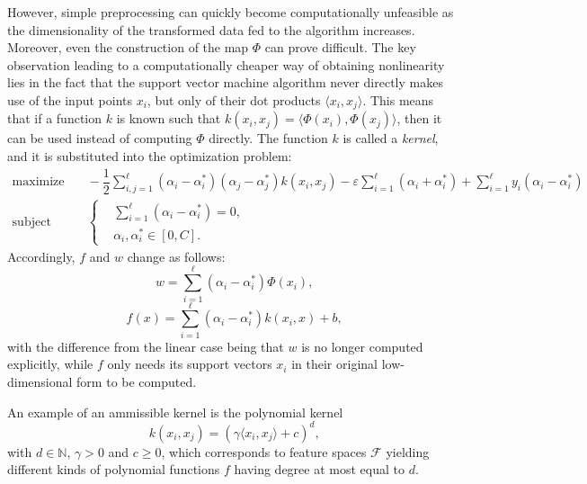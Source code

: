 \documentclass[12pt]{report}
\begin{document}
However, simple preprocessing can quickly become computationally unfeasible as the dimensionality of the transformed data fed to the algorithm increases. Moreover, even the construction of the map $\Phi$ can prove difficult. The key observation leading to a computationally cheaper way of obtaining nonlinearity lies in the fact that the support vector machine algorithm never directly makes use of the input points $ x_{i} $, but only of their dot products $ \langle x_{i},x_{j} \rangle $. This means that if a function $ k $ is known such that $ k(x_{i},x_{j}) = \langle\Phi (x_{i}),\Phi (x_{j})\rangle $, then it can be used instead of computing $ \Phi $ directly. The function $ k $ is called a \textit{kernel}, and it is substituted into the optimization problem:
\begin{equation} \label{kernelsmargdual}
\begin{split}
\text{maximize} &\quad
-\dfrac{1}{2}\sum_{i,j=1}^{\ell}(\alpha_{i} - \alpha_{i}^{*})(\alpha_{j} - \alpha_{j}^{*})k(x_{i},x_{j}) -\varepsilon\sum_{i=1}^{\ell}(\alpha_{i} + \alpha_{i}^{*}) + \sum_{i=1}^{\ell}y_{i}(\alpha_{i}-\alpha_{i}^{*}) \\
\text{subject to} &\quad \left\{\begin{split}
&\sum_{i=1}^{\ell}(\alpha_{i} - \alpha_{i}^{*}) = 0 \text{,}\\
&\alpha_{i},\alpha_{i}^{*} \in [0,C] \text{.}
\end{split}\right.
\end{split}
\end{equation}
Accordingly, $ f $ and $ w $ change as follows:
\begin{equation} \label{wnonlinear}
w = \sum_{i=1}^{\ell}(\alpha_{i}-\alpha_{i}^{*})\Phi(x_{i}) \text{,}
\end{equation}
\begin{equation} \label{kernelfsvexp}
f(x) = \sum_{i=1}^{\ell}(\alpha_{i}-\alpha_{i}^{*})k(x_{i},x) + b \text{,}
\end{equation}
with the difference from the linear case being that $ w $ is no longer computed explicitly, while $ f $ only needs its support vectors $ x_{i} $ in their original low-dimensional form to be computed.

An example of an ammissible kernel is the polynomial kernel
\begin{equation} \label{polykernel}
k(x_{i},x_{j}) = (\gamma\langle x_{i},x_{j} \rangle + c)^{d} \text{,}
\end{equation}
with $ d \in \mathbb{N} $, $ \gamma > 0 $ and $ c \geq 0 $, which corresponds to feature spaces $ \mathcal{F} $ yielding different kinds of polynomial functions $ f $ having degree at most equal to $d$.
\end{document}
